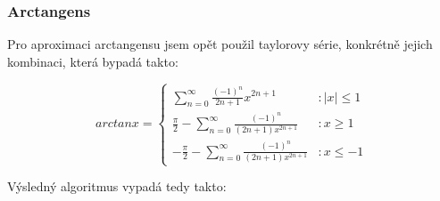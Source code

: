 \documentclass{article}
\begin{document}
    \subsubsection{Arctangens}
    Pro aproximaci arctangensu jsem opět použil taylorovy série, konkrétně jejich kombinaci, která bypadá takto:
    \begin{center}
        \begin{equation}            
            arctan x = \begin{cases}
                \displaystyle\sum_{n=0}^{\infty}\frac{(-1)^n}{2n+1}x^{2n+1} & \text{$: |x|\leq 1$}\\
                \frac{\pi}{2}-\displaystyle\sum_{n=0}^{\infty}\frac{(-1)^n}{(2n+1)x^{2n+1}} & \text{$: x \geq 1$}\\
                -\frac{\pi}{2}-\displaystyle\sum_{n=0}^{\infty}\frac{(-1)^n}{(2n+1)x^{2n+1}} & \text{$: x \leq -1$}
            \end{cases}
        \end{equation}
    \end{center}
    Výsledný algoritmus vypadá tedy takto:
    \sloppy
\end{document}
